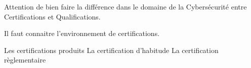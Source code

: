 Attention de bien faire la différence dans le domaine de la Cybersécurité entre  Certifications et Qualifications.

Il faut connaitre l'environnement de certifications.

Les certifications produits
La certification d'habitude
La certification règlementaire

